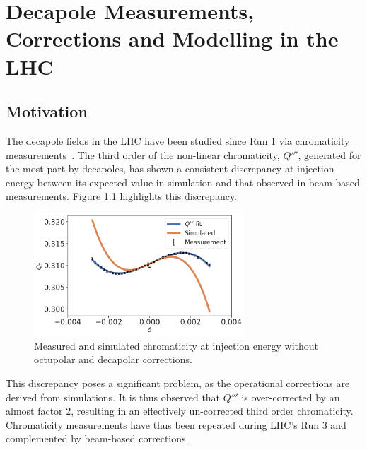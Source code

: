 \chapter{Decapole Measurements, Corrections and Modelling in the LHC}
\thumbforchapter{}
\chaptertoc{}
\newpage

\section{Motivation}

The decapole fields in the LHC have been studied since Run 1 via chromaticity 
measurements~\cite{maclean_non-linear_2011,maclean_commissioning_2016,maclean_measurement_2014}. 
The third order of the non-linear chromaticity, $Q'''$, generated for the most part by decapoles,
has shown a consistent discrepancy at injection energy between its expected value in simulation and
that observed in beam-based measurements.
Figure \ref{fig:decapoles:bare_chroma_vs_simulations} highlights this discrepancy.

\begin{figure}[H]
    \centering
    \includegraphics[width=0.7\textwidth]{images/bare_chroma_simulated.png}
    \caption{Measured and simulated chromaticity at injection energy without octupolar and
             decapolar corrections.}
    \label{fig:decapoles:bare_chroma_vs_simulations}
\end{figure}

This discrepancy poses a significant problem, as the operational corrections are derived from
simulations. It is thus observed that $Q'''$ is over-corrected by an almost factor 2, resulting in
an effectively un-corrected third order chromaticity.
Chromaticity measurements have thus been repeated during LHC's Run 3 and complemented by beam-based
corrections.

